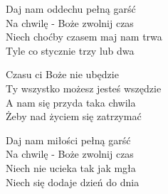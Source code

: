 \begin{text}
    Daj nam oddechu pełną garść\\
    Na chwilę - Boże zwolnij czas\\
    Niech choćby czasem maj nam trwa\\
    Tyle co stycznie trzy lub dwa

    \vin Czasu ci Boże nie ubędzie\\
    \vin Ty wszystko możesz jesteś wszędzie\\
    \vin A nam się przyda taka chwila\\
    \vin Żeby nad życiem się zatrzymać

    Daj nam miłości pełną garść\\
    Na chwilę - Boże zwolnij czas\\
    Niech nie ucieka tak jak mgła\\
    Niech się dodaje dzień do dnia
\end{text}
\begin{chord}

\end{chord}